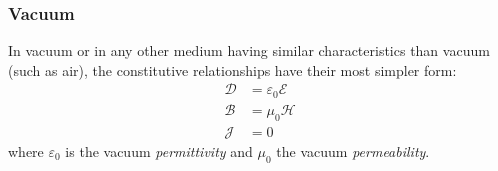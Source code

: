 
\subsubsection{Vacuum}
In vacuum or in any other medium having similar characteristics than vacuum (such as air), the constitutive relationships have their most simpler form:
\begin{subequations}
 \begin{align}
  \boldsymbol{\mathcal{D}} &= \varepsilon_0 \boldsymbol{\mathcal{E}} \\
  \boldsymbol{\mathcal{B}} &= \mu_0 \boldsymbol{\mathcal{H}} \\
  \boldsymbol{\mathcal{J}} &= 0
 \end{align}
\end{subequations}
where $\varepsilon_0$ is the vacuum \emph{permittivity} and $\mu_0$ the vacuum \emph{permeability}. 

